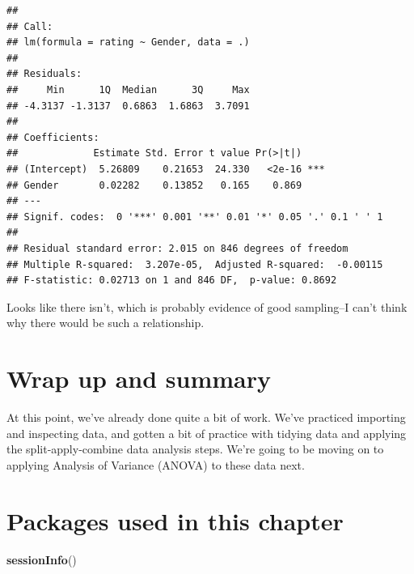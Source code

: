 \documentclass[
]{book}
\newenvironment{Shaded}{\begin{snugshade}}{\end{snugshade}}
\newcommand{\FunctionTok}[1]{\textcolor[rgb]{0.13,0.29,0.53}{\textbf{#1}}}
\newcommand{\NormalTok}[1]{#1}
\begin{document}
\begin{verbatim}
## 
## Call:
## lm(formula = rating ~ Gender, data = .)
## 
## Residuals:
##     Min      1Q  Median      3Q     Max 
## -4.3137 -1.3137  0.6863  1.6863  3.7091 
## 
## Coefficients:
##             Estimate Std. Error t value Pr(>|t|)    
## (Intercept)  5.26809    0.21653  24.330   <2e-16 ***
## Gender       0.02282    0.13852   0.165    0.869    
## ---
## Signif. codes:  0 '***' 0.001 '**' 0.01 '*' 0.05 '.' 0.1 ' ' 1
## 
## Residual standard error: 2.015 on 846 degrees of freedom
## Multiple R-squared:  3.207e-05,  Adjusted R-squared:  -0.00115 
## F-statistic: 0.02713 on 1 and 846 DF,  p-value: 0.8692
\end{verbatim}

Looks like there isn't, which is probably evidence of good sampling--I can't think why there would be such a relationship.

\section{Wrap up and summary}\label{wrap-up-and-summary}

At this point, we've already done quite a bit of work. We've practiced importing and inspecting data, and gotten a bit of practice with tidying data and applying the split-apply-combine data analysis steps. We're going to be moving on to applying Analysis of Variance (ANOVA) to these data next.

\section{Packages used in this chapter}\label{packages-used-in-this-chapter}

\begin{Shaded}
\begin{Highlighting}[]
\FunctionTok{sessionInfo}\NormalTok{()}
\end{Highlighting}
\end{Shaded}
\end{document}
